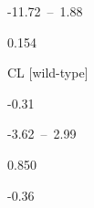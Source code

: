 \documentclass[
  letterpaper,
  DIV=11,
  numbers=noendperiod]{scrartcl}
\begin{document}
\begin{table}
\begin{minipage}[t]{\linewidth}
{}

\end{minipage}%
\newline
\begin{minipage}[t]{\linewidth}

{\centering 

-11.72~--~1.88

}

\end{minipage}%
\newline
\begin{minipage}[t]{\linewidth}

{\centering 

0.154

}

\end{minipage}%
\newline
\begin{minipage}[t]{\linewidth}

{\centering 

CL {[}wild-type{]}

}

\end{minipage}%
\newline
\begin{minipage}[t]{\linewidth}

{\centering 

-0.31

}

\end{minipage}%
\newline
\begin{minipage}[t]{\linewidth}

{\centering 

-3.62~--~2.99

}

\end{minipage}%
\newline
\begin{minipage}[t]{\linewidth}

{\centering 

0.850

}

\end{minipage}%
\newline
\begin{minipage}[t]{\linewidth}

{\centering 

-0.36

}


\end{minipage}
\end{table}
\end{document}
